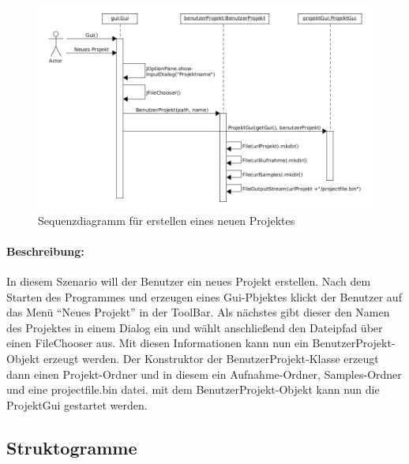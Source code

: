 \newpage

\begin{figure}[h]
 \centering
 \includegraphics[width=1\textwidth]{./Bilder/Neues_Projekt.png}
 \caption{Sequenzdiagramm für erstellen eines neuen Projektes} 
\end{figure}

\paragraph{Beschreibung:} In diesem Szenario will der Benutzer ein neues Projekt erstellen. Nach 
dem Starten des Programmes und erzeugen eines Gui-Pbjektes klickt der Benutzer auf das Menü ``Neues 
Projekt'' in der ToolBar. Als nächstes gibt dieser den Namen des Projektes in einem Dialog ein und 
wählt anschließend den Dateipfad über einen FileChooser aus. Mit diesen Informationen kann nun ein 
BenutzerProjekt-Objekt erzeugt werden. Der Konstruktor der BenutzerProjekt-Klasse erzeugt dann 
einen Projekt-Ordner und in diesem ein Aufnahme-Ordner, Samples-Ordner und eine projectfile.bin 
datei. mit dem BenutzerProjekt-Objekt kann nun die ProjektGui gestartet werden.\\



\newpage

\subsection{Struktogramme}


